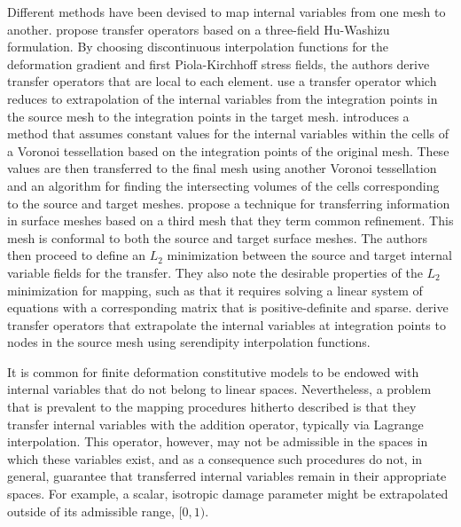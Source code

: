 \documentclass[12pt]{article}
\begin{document}
Different methods have been devised to map internal variables from one mesh to
another. \citet{Ortiz.Quigley:1991} propose transfer operators based on a
three-field Hu-Washizu formulation. By choosing discontinuous interpolation
functions for the deformation gradient and first Piola-Kirchhoff stress fields,
the authors derive transfer operators that are local to each element.
\citet{Radovitzky.Ortiz:1999} use a transfer operator which reduces to
extrapolation of the internal variables from the integration points in the
source mesh to the integration points in the target mesh.  \citet{Rashid:2002}
introduces a method that assumes constant values for the internal variables
within the cells of a Voronoi tessellation based on the integration points of
the original mesh. These values are then transferred to the final mesh using
another Voronoi tessellation and an algorithm for finding the intersecting
volumes of the cells corresponding to the source and target meshes.
\citet{Jiao.Heath:2004} propose a technique for transferring information in
surface meshes based on a third mesh that they term common refinement. This mesh
is conformal to both the source and target surface meshes. The authors then
proceed to define an $L_2$ minimization between the source and target internal
variable fields for the transfer. They also note the desirable properties of the
$L_2$ minimization for mapping, such as that it requires solving a linear system
of equations with a corresponding matrix that is positive-definite and sparse.
\citet{Bucher.etal:2007} derive transfer operators that extrapolate the internal
variables at integration points to nodes in the source mesh using serendipity
interpolation functions.

It is common for finite deformation constitutive models to be endowed with
internal variables that do not belong to linear spaces. Nevertheless, a problem
that is prevalent to the mapping procedures hitherto described is that they
transfer internal variables with the addition operator, typically via Lagrange
interpolation. This operator, however, may not be admissible in the spaces in
which these variables exist, and as a consequence such procedures do not, in
general, guarantee that transferred internal variables remain in their
appropriate spaces. For example, a scalar, isotropic damage parameter might be
extrapolated outside of its admissible range, $[0,1)$.
\end{document}
